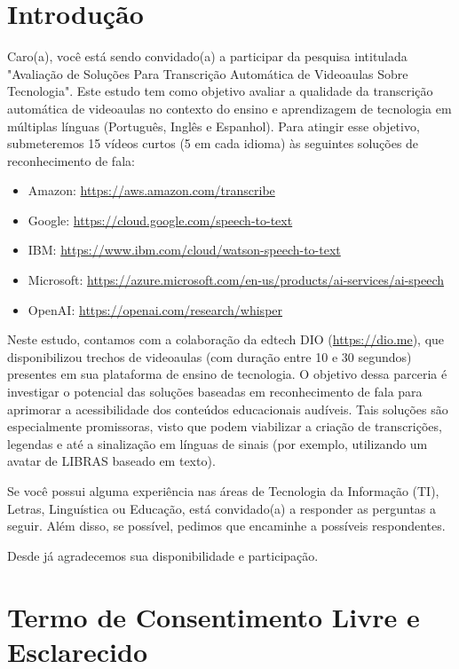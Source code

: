 \section{Introdução}

\noindent
Caro(a), você está sendo convidado(a) a participar da pesquisa intitulada "Avaliação de 
Soluções Para Transcrição Automática de Videoaulas Sobre Tecnologia". Este estudo 
tem como objetivo avaliar a qualidade da transcrição automática de videoaulas no 
contexto do ensino e aprendizagem de tecnologia em múltiplas línguas (Português, 
Inglês e Espanhol). Para atingir esse objetivo, submeteremos 15 vídeos curtos (5 em 
cada idioma) às seguintes soluções de reconhecimento de fala:

\begin{itemize}
    \item Amazon: \url{https://aws.amazon.com/transcribe}
    \item Google: \url{https://cloud.google.com/speech-to-text}
    \item IBM: \url{https://www.ibm.com/cloud/watson-speech-to-text}
    \item Microsoft: \url{https://azure.microsoft.com/en-us/products/ai-services/ai-speech}
    \item OpenAI: \url{https://openai.com/research/whisper}
\end{itemize}

\noindent
Neste estudo, contamos com a colaboração da edtech DIO (\url{https://dio.me}), que disponibilizou 
trechos de videoaulas (com duração entre 10 e 30 segundos) presentes em sua 
plataforma de ensino de tecnologia. O objetivo dessa parceria é investigar o potencial 
das soluções baseadas em reconhecimento de fala para aprimorar a acessibilidade dos 
conteúdos educacionais audíveis. Tais soluções são especialmente promissoras, visto 
que podem viabilizar a criação de transcrições, legendas e até a sinalização em línguas 
de sinais (por exemplo, utilizando um avatar de LIBRAS baseado em texto).

\noindent
Se você possui alguma experiência nas áreas de Tecnologia da Informação (TI), Letras, 
Linguística ou Educação, está convidado(a) a responder as perguntas a seguir. Além disso, se 
possível, pedimos que encaminhe a possíveis respondentes.

\noindent
Desde já agradecemos sua disponibilidade e participação.

\section{Termo de Consentimento Livre e Esclarecido}

